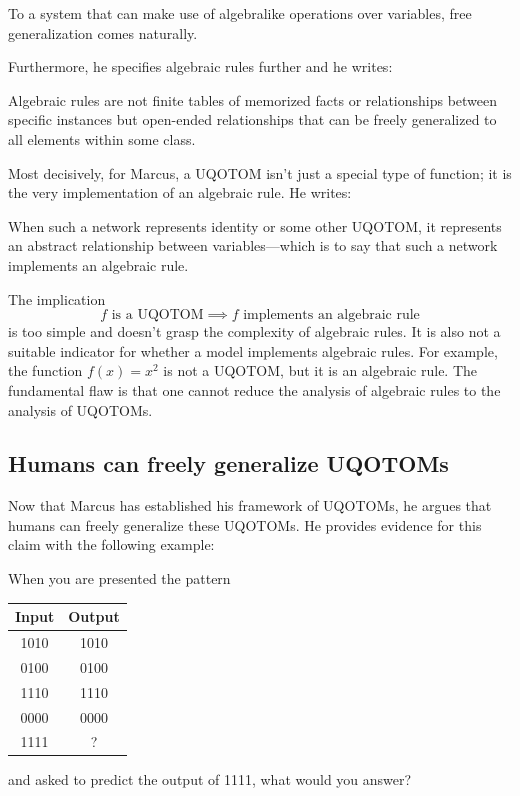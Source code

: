 \documentclass[../../main.tex]{subfiles}
\begin{document}
\begin{citecallout}
    To a system that can make use of algebralike operations over variables,
    free generalization comes naturally.
\end{citecallout}

Furthermore, he specifies algebraic rules further and he writes:

\begin{citecallout}
    Algebraic rules are not finite tables of memorized facts or relationships between specific instances but open-ended relationships that can be freely generalized to all elements within some class.
\end{citecallout}

Most decisively, for Marcus, a UQOTOM isn't just a special type of function; it is the very implementation of an algebraic rule. He writes:

\begin{citecallout}
    When such a network represents identity or some other UQOTOM,
    it represents an abstract relationship between variables—which is to say
    that such a network implements an algebraic rule.
\end{citecallout}

\begin{critique}
    The implication
    \[
        f \text{ is a UQOTOM} \implies f \text{ implements an algebraic rule}
    \]
    is too simple and doesn't grasp the complexity of algebraic rules. It is also not a suitable indicator for whether a model implements algebraic rules. For example, the function $f(x) = x^2$ is not a UQOTOM, but it is an algebraic rule. The fundamental flaw is that one cannot reduce the analysis of algebraic rules to the analysis of UQOTOMs.
\end{critique}

\subsection{Humans can freely generalize UQOTOMs}
Now that Marcus has established his framework of UQOTOMs, he argues that humans can freely generalize these UQOTOMs. He provides evidence for this claim with the following example:

\begin{example}
    When you are presented the pattern
        \begin{table}[h]
        \centering
        \begin{tabular}{c|c}
            Input & Output \\
            \hline
            1010 & 1010 \\
            0100 & 0100 \\
            1110 & 1110 \\
            0000 & 0000 \\
            1111 & ? \\
        \end{tabular}
    \end{table}
    and asked to predict the output of 1111, what would you answer?
\end{example}
\end{document}
